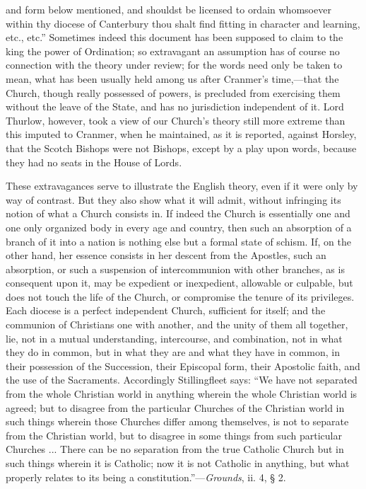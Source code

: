 and form below mentioned, and shouldst be licensed to ordain
whomsoever within thy diocese of Canterbury thou shalt find fitting in
character and learning, etc., etc.'' Sometimes indeed this document has
been supposed to claim to the king the power of Ordination; so
extravagant an assumption has of course no connection with the theory
under review; for the words need only be taken to mean, what has been
usually held among us after Cranmer's time,—that the Church, though
really possessed of powers, is precluded from exercising them without
the leave of the State, and has no jurisdiction independent of it.
Lord Thurlow, however, took a view of our Church's theory still more
extreme than this imputed to Cranmer, when he maintained, as it
is reported, against Horsley, that the Scotch Bishops were not
Bishops, except by a play upon words, because they had no seats in the
House of Lords.

These extravagances serve to illustrate the
English theory, even if it were only by way of contrast. But they also
show what it will admit, without infringing its notion of what a
Church consists in. If indeed the Church is essentially one and one
only organized body in every age and country, then such an absorption
of a branch of it into a nation is nothing else but a formal state of
schism. If, on the other hand, her essence consists in her descent
from the Apostles, such an absorption, or such a suspension of
intercommunion with other branches, as is consequent upon it, may be
expedient or inexpedient, allowable or culpable, but does not touch
the life of the Church, or compromise the tenure of its privileges.
Each diocese is a perfect independent Church, sufficient for itself;
and the communion of Christians one with another, and the unity of
them all together, lie, not in a mutual understanding, intercourse,
and combination, not in what they do in common, but in what they are
and what they have in common, in their possession of the Succession,
their Episcopal form, their Apostolic faith, and the use of the
Sacraments. Accordingly Stillingfleet says: ``We have not separated
from the whole Christian world in anything wherein the whole Christian
world is agreed; but to disagree from the particular Churches of the
Christian world in such things wherein those Churches differ among
themselves, is not to separate from the Christian world, but to
disagree in some things from such particular Churches ... There can be
no separation from the true Catholic Church but in such things wherein
it is Catholic; now it is not Catholic in anything, but what
properly relates to its being a constitution.''—\emph{Grounds}, ii.
4, § 2.

